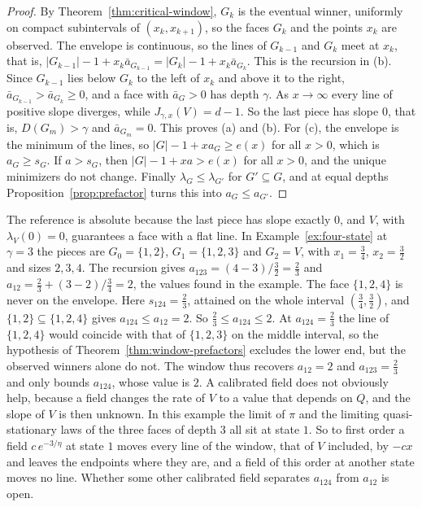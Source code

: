 \begin{proof}
By Theorem~\ref{thm:critical-window}, $G_k$ is the eventual winner, uniformly on
compact subintervals of $(x_k,x_{k+1})$, so the faces $G_k$ and the points $x_k$
are observed. The envelope is continuous, so the lines of $G_{k-1}$ and $G_k$
meet at $x_k$, that is,
$|G_{k-1}|-1+x_k\bar a_{G_{k-1}}=|G_k|-1+x_k\bar a_{G_k}$. This is the recursion
in (b). Since $G_{k-1}$ lies below $G_k$ to the left of $x_k$ and above it to
the right, $\bar a_{G_{k-1}}>\bar a_{G_k}\ge0$, and a face with $\bar a_G>0$ has
depth $\gamma$. As $x\to\infty$ every line of positive slope diverges, while
$J_{\gamma,x}(V)=d-1$. So the last piece has slope $0$, that is,
$D(G_m)>\gamma$ and $\bar a_{G_m}=0$. This proves (a) and (b). For (c), the
envelope is the minimum of the lines, so $|G|-1+xa_G\ge e(x)$ for all $x>0$,
which is $a_G\ge s_G$. If $a>s_G$, then $|G|-1+xa>e(x)$ for all $x>0$, and the unique
minimizers do not change. Finally $\lambda_G\le\lambda_{G'}$ for $G'\subseteq G$,
and at equal depths Proposition~\ref{prop:prefactor} turns this into
$a_G\le a_{G'}$.
\end{proof}

The reference is absolute because the last piece has slope exactly $0$, and
$V$, with $\lambda_V(0)=0$, guarantees a face with a flat line. In
Example~\ref{ex:four-state} at $\gamma=3$ the pieces are $G_0=\{1,2\}$,
$G_1=\{1,2,3\}$ and $G_2=V$, with $x_1=\frac34$, $x_2=\frac32$ and sizes
$2,3,4$. The recursion gives $a_{123}=(4-3)/\frac32=\frac23$ and
$a_{12}=\frac23+(3-2)/\frac34=2$, the values found in the example. The face
$\{1,2,4\}$ is never on the envelope. Here $s_{124}=\frac23$, attained on the
whole interval $(\frac34,\frac32)$, and $\{1,2\}\subseteq\{1,2,4\}$ gives
$a_{124}\le a_{12}=2$. So $\frac23\le a_{124}\le2$. At $a_{124}=\frac23$ the
line of $\{1,2,4\}$ would coincide with that of $\{1,2,3\}$ on the middle
interval, so the hypothesis of Theorem~\ref{thm:window-prefactors} excludes
the lower end, but the observed winners alone do not. The window thus recovers
$a_{12}=2$ and $a_{123}=\frac23$ and only bounds $a_{124}$, whose value is $2$.
A calibrated field does not obviously help, because a field changes the rate
of $V$ to a value that depends on $Q$, and the slope of $V$ is then unknown. In
this example the limit of $\pi$ and the limiting quasi-stationary laws of the
three faces of depth $3$ all sit at state $1$. So to first order a field
$c\,e^{-3/\eta}$ at state $1$ moves every line of the window, that of $V$
included, by $-cx$ and leaves the endpoints where they are, and a field of this
order at another state moves no line. Whether some other calibrated field
separates $a_{124}$ from $a_{12}$ is open.

